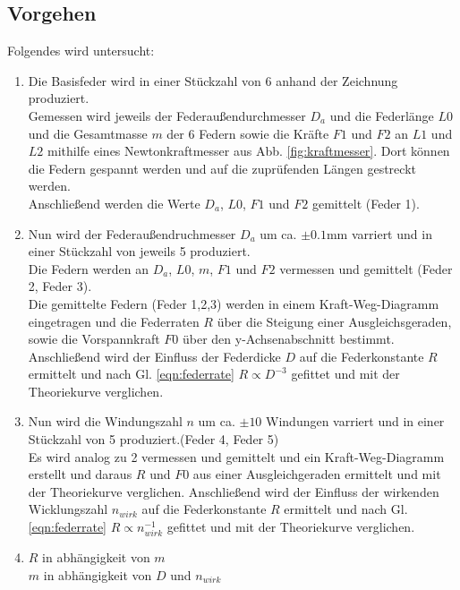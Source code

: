 \subsection{Vorgehen}
Folgendes wird untersucht:
\begin{enumerate}
    \item   Die Basisfeder wird in einer Stückzahl von 6 anhand der Zeichnung produziert.\\
            Gemessen wird jeweils der Federaußendurchmesser $D_a$ und die Federlänge 
            $L0$ und die Gesamtmasse $m$ der 6 Federn sowie die Kräfte $F1$ und $F2$ an $L1$ und $L2$ mithilfe eines Newtonkraftmesser aus Abb. \ref{fig:kraftmesser}.
            Dort können die Federn gespannt werden und auf die zuprüfenden Längen gestreckt werden.\\
            Anschließend werden die Werte $D_a$, $L0$, $F1$ und $F2$ gemittelt (Feder 1).

    \item   Nun wird der Federaußendruchmesser $D_a$ um ca. $\pm0.1$mm varriert und in einer 
            Stückzahl von jeweils 5 produziert.\\
            Die Federn werden an $D_a$, $L0$, $m$, $F1$ und $F2$ vermessen und gemittelt (Feder 2, Feder 3).\\
            Die gemittelte Federn (Feder 1,2,3) werden in einem Kraft-Weg-Diagramm eingetragen und
            die Federraten $R$ über die Steigung einer Ausgleichsgeraden, sowie die Vorspannkraft $F0$ 
            über den y-Achsenabschnitt bestimmt.\\
            Anschließend wird der Einfluss der Federdicke $D$ auf die Federkonstante $R$ ermittelt
            und nach Gl. \ref{eqn:federrate} $R \propto D^{-3}$ gefittet und mit der Theoriekurve verglichen.

    \item   Nun wird die Windungszahl $n$ um ca. $\pm 10$ Windungen varriert und in einer Stückzahl von 5 produziert.(Feder 4, Feder 5)\\
            Es wird analog zu 2 vermessen und gemittelt und ein Kraft-Weg-Diagramm erstellt und
            daraus $R$ und $F0$ aus einer Ausgleichgeraden ermittelt und mit der Theoriekurve verglichen.
            Anschließend wird der Einfluss der wirkenden Wicklungszahl $n_{wirk}$ auf die Federkonstante $R$ ermittelt
            und nach Gl. \ref{eqn:federrate} $R \propto n_{wirk}^{-1}$ gefittet und mit der Theoriekurve verglichen.

    \item   $R$ in abhängigkeit von $m$\\
            $m$ in abhängigkeit von $D$ und $n_{wirk}$  
\end{enumerate}
